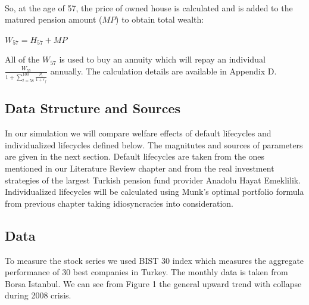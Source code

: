 \documentclass[]{article}
\begin{document}
\paragraph{}So, at the age of 57, the price of owned house is calculated and is added to the matured pension amount ($MP$) to obtain total wealth:

\begin{center}
	$W_{57} = H_{57} + MP$
\end{center}

All of the $W_{57}$ is used to buy an annuity which will repay an individual $\frac{W_{57}}{1+\sum^{100}_{t=58} \frac{p_t}{1+r_f}}$ annually. The calculation details are available in Appendix D. 



\subsection{Data Structure and Sources}
\label{data}

In our simulation we will compare welfare effects of default lifecycles and individualized lifecycles defined below. The magnitutes and sources of parameters are given in the next section. Default lifecycles are taken from the ones mentioned in our Literature Review chapter and from the real investment strategies of the largest Turkish pension fund provider Anadolu Hayat Emeklilik. Individualized lifecycles will be calculated using Munk's optimal portfolio formula from previous chapter taking idiosyncracies into consideration.

\subsection{Data}

To measure the stock series we used BIST 30 index which measures the aggregate performance of 30 best companies in Turkey. The monthly data is taken from Borsa Istanbul. We can see from Figure 1 the general upward trend with collapse during 2008 crisis.
\end{document}
